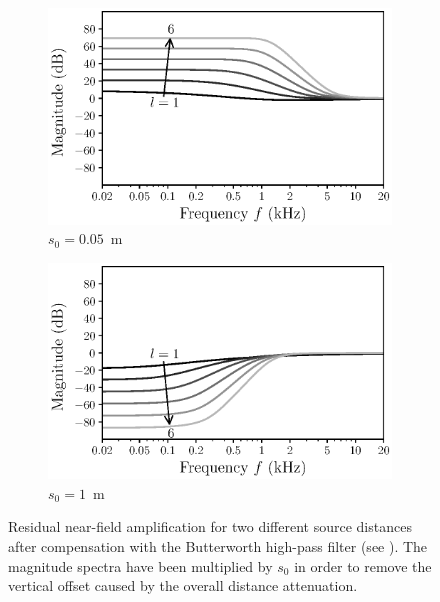 \begin{figure}[t]
    \centering
    \begin{subfigure}[b]{0.49\textwidth}
        \includegraphics[width=\textwidth]{02_acoustical_theory/figures/nearfield_compensation_5cm.eps}
        \caption{$s_0 = 0.05$~m}
    \end{subfigure}
    \hfill
    \begin{subfigure}[b]{0.49\textwidth}
        \includegraphics[width=\textwidth]{02_acoustical_theory/figures/nearfield_compensation_100cm.eps}
        \caption{$s_0 = 1$~m}
    \end{subfigure}
\caption[Residual near-field amplification after compensation.]{
Residual near-field amplification for two different source distances after compensation with the Butterworth high-pass filter (see ).
The magnitude spectra have been multiplied by $s_0$ in order to remove the vertical offset caused by the overall distance attenuation.}
\label{fig:02_Acoustical_Theory:Nearfield_Compensation}
\end{figure} %